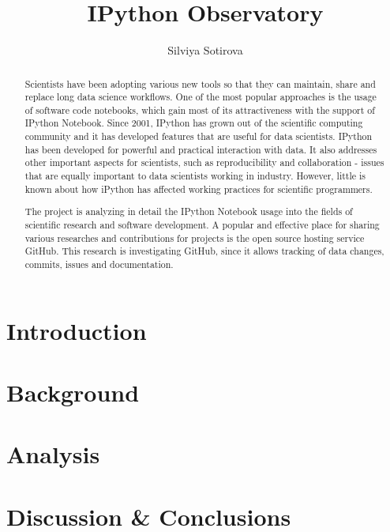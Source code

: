 \documentclass{mpaper}
\begin{document}
\title{IPython Observatory}
\author{Silviya Sotirova}

\maketitle

\begin{abstract}

Scientists have been adopting various new tools so that they can maintain, share and replace long data science workflows. One of the most popular approaches is the usage of software code notebooks, which gain most of its attractiveness with the support of IPython Notebook. Since 2001, IPython has grown out of the scientific computing community and it has developed features that are useful for data scientists. IPython has been developed for powerful and practical interaction with data. It also addresses other important aspects for scientists, such as reproducibility and collaboration - issues that are equally important to data scientists working in industry. However, little is known about how iPython has affected working practices for scientific programmers.

The project is analyzing in detail the IPython Notebook usage into the fields of scientific research and software development. A popular and effective place for sharing various researches and contributions for projects is the open source hosting service GitHub. This research is investigating GitHub, since it allows tracking of data changes, commits, issues and documentation. 

\end{abstract}
\section{Introduction}



\section{Background}


\section{Analysis}


\section{Discussion \& Conclusions}


\vspace{5mm}


\end{document}
